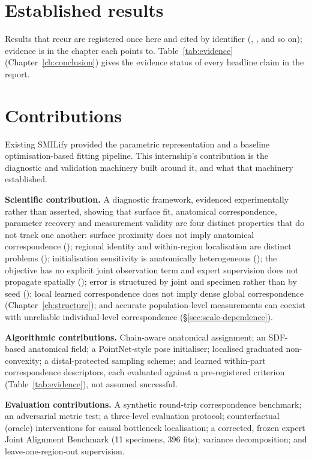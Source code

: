 \section{Established results}
\label{sec:ledger}

Results that recur are registered once here and cited by identifier
(, , and so on); evidence is in the chapter each points to. Table~\ref{tab:evidence}
(Chapter~\ref{ch:conclusion}) gives the evidence status of every headline
claim in the report.

\printfindingledger

\section{Contributions}

Existing SMILify provided the parametric representation and a baseline
optimisation-based fitting pipeline. This internship's contribution is the
diagnostic and validation machinery built around it, and what that machinery
established.

\textbf{Scientific contribution.} A diagnostic framework, evidenced
experimentally rather than asserted, showing that surface fit, anatomical
correspondence, parameter recovery and measurement validity are four
distinct properties that do not track one another: surface proximity does
not imply anatomical correspondence (); regional identity and
within-region localisation are distinct problems (); initialisation
sensitivity is anatomically heterogeneous (); the objective has no
explicit joint observation term and expert supervision does not propagate
spatially (); error is structured by joint and specimen rather than by
seed (); local learned correspondence does not imply dense global
correspondence (Chapter~\ref{ch:structure}); and accurate population-level
measurements can coexist with unreliable individual-level correspondence
(\S\ref{sec:scale-dependence}).

\textbf{Algorithmic contributions.} Chain-aware anatomical assignment; an
SDF-based anatomical field; a PointNet-style pose initialiser; localised
graduated non-convexity; a distal-protected sampling scheme; and learned
within-part correspondence descriptors, each evaluated against a
pre-registered criterion (Table~\ref{tab:evidence}), not assumed successful.

\textbf{Evaluation contributions.} A synthetic round-trip correspondence
benchmark; an adversarial metric test; a three-level evaluation protocol;
counterfactual (oracle) interventions for causal bottleneck localisation; a
corrected, frozen expert Joint Alignment Benchmark (11 specimens, 396 fits);
variance decomposition; and leave-one-region-out supervision.

